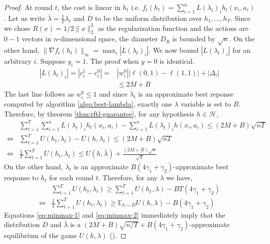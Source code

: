 \documentclass{article}
\newcommand{\E}{\mathbb{E}}
\newcommand{\abs}[1]{\left|#1\right|}
\newcommand{\HH}{\mathcal{H}}
\newcommand{\norm}[1]{\lVert #1 \rVert}
\begin{document}
\begin{proof}
At round $t$, the cost is linear in $h_t$ i.e. $f_t(h_t) = \sum_{i=1}^n L(\lambda_t)_i h_t(x_i,a_i)$. Let us write $\bar{\lambda} = \frac{1}{T} \lambda_t$ and $D$ to be the uniform distribution over $h_1,\ldots,h_T$. Since we chose $R(x) = 1/2 \norm{x}_2^2$ as the regularization function and the actions are $0-1$ vectors in $n$-dimensional space, the diameter $D_R$ is bounded by $\sqrt{n}$. On the other hand, $\norm{\nabla f_t(h_t)}_{\infty} = \max_i \abs{L(\lambda_t)_i} $. We now bound $\abs{L(\lambda_t)_i}$ for an arbitrary $i$. Suppose $y_i=1$. The proof when $y=0$ is identical.
\begin{align*}
\abs{L(\lambda_t)_i} = \abs{c^1_i - c^0_i} = &\abs{w^0_i}\abs{\ell(0,1) - \ell(1,1)} + \abs{\Delta_i} \\
&\le 2M + B
\end{align*}
The last line follows as $w^0_i \le 1$ and since $\lambda_t$ is an approximate best reponse computed by algorithm \ref{algo:best-lambda}, exactly one $\lambda$ variable is set to $B$.
Therefore, by theorem \ref{thm:rftl-guarantee}, for any hypothesis $h \in \HH$,
\begin{align}
&\sum_{t=1}^T \sum_{i=1}^n L(\lambda_t)_i h_t(x_i,a_i) - \sum_{i=1}^n L(\lambda_t)_i h(x_i,a_i) \le (2M + B)\sqrt{nT}\nonumber \\
\Leftrightarrow &\sum_{t=1}^T U(h_t,\lambda_t) - U(h,\lambda_t) \le (2M + B)\sqrt{nT}\nonumber \\
\Leftrightarrow &\frac{1}{T} \sum_{t=1}^T U(h_t,\lambda_t) \le U(h,\bar{\lambda}) + \frac{(2M + B)\sqrt{n}}{\sqrt{T}} \label{eq:minmax-1}
\end{align}
On the other hand, $\lambda_t$ is an approximate $B(4\gamma_1 + \gamma_2)$-approximate best response to $h_t$ for each round $t$. Therefore, for any $\lambda$ we have,
\begin{align}
&\sum_{t=1}^T U(h_t,\lambda_t) \ge \sum_{t=1}^T U(h_t,\lambda) - BT(4\gamma_1 + \gamma_2)\nonumber \\
\Leftrightarrow &\frac{1}{T} \sum_{t=1}^T U(h_t,\lambda_t) \ge \E_{h \sim D} U(h,\lambda) - B(4\gamma_1 + \gamma_2) \label{eq:minmax-2}
\end{align}
Equations \ref{eq:minmax-1} and \ref{eq:minmax-2} immediately imply that the distribution $D$ and $\bar{\lambda}$ is a $(2M + B)\sqrt{n/T} + B(4\gamma_1 + \gamma_2)$-approximate equilibrium of the game $U(h,\lambda)$ (\cite{FS96}).
\end{proof}
\end{document}
